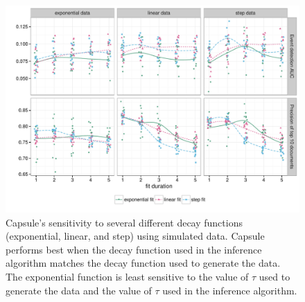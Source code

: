 \begin{figure}[th]
\centering
\includegraphics[width=\linewidth]{fig/sim_sensitivity.pdf}
\caption{Capsule's sensitivity to several different decay functions
(exponential, linear, and step) using simulated data. Capsule performs
best when the decay function used in the inference algorithm matches
the decay function used to generate the data. The exponential function
is least sensitive to the value of $\tau$ used to generate the data
and the value of $\tau$ used in the inference algorithm.}
\label{fig:sensitivity}
\end{figure}













